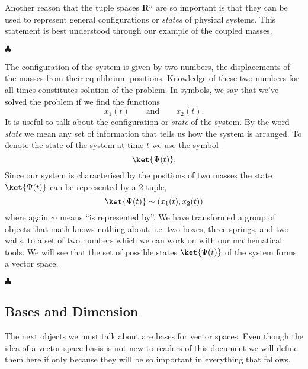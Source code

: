 Another reason that the tuple spaces \textbf{R}$^{n}$ are so important is that they can be used to represent general configurations or \textit{states} of physical systems.
This statement is best understood through our example of the coupled masses.

\begin{flushleft} $\clubsuit$ \end{flushleft}
The configuration of the system is given by two numbers, the displacements of the masses from their equilibrium positions.
Knowledge of these two numbers for all times constitutes solution of the problem.
In symbols, we say that we've solved the problem if we find the functions
\begin{equation}
x_{1}(t) \qquad \textrm{and} \qquad x_{2}(t).
\end{equation}
It is useful to talk about the configuration or \textit{state} of the system.
By the word \textit{state} we mean any set of information that tells us how the system is arranged.
To denote the state of the system at time $t$ we use the symbol
\begin{displaymath}
\ket{\Psi (t)}.
\end{displaymath}
Since our system is characterised by the positions of two masses the state $\ket{\Psi (t)}$ can be represented by a 2-tuple,
\begin{equation} \label{eq:Psirep}
\ket{\Psi (t)} \sim (x_{1}(t),x_2(t))
\end{equation}
where again $\sim$ means ``is represented by''.
We have transformed a group of objects that math knows nothing about, i.e. two boxes, three springs, and two walls, to a set of two numbers which we can work on with our mathematical tools.
We will see that the set of possible states $\ket{\Psi (t)}$ of the system forms a vector space.\begin{flushright} $\clubsuit$ \end{flushright}

\subsection{Bases and Dimension}

The next objects we must talk about are bases for vector spaces.
Even though the idea of a vector space basis is not new to readers of this document we will define them here if only because they will be so important in everything that follows.

